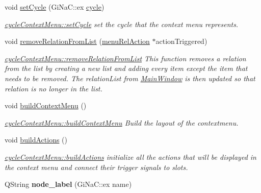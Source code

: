 \begin{DoxyCompactItemize}
void \mbox{\hyperlink{classcycle_context_menu_adf29caf51604118b6ced6a02c5172252}{set\+Cycle}} (Gi\+Na\+C\+::ex \mbox{\hyperlink{class_moeb_inv_1_1cycle}{cycle}})
\begin{DoxyCompactList}\small\item\em \mbox{\hyperlink{classcycle_context_menu_adf29caf51604118b6ced6a02c5172252}{cycle\+Context\+Menu\+::set\+Cycle}} set the cycle that the context menu represents. \end{DoxyCompactList}\item 
void \mbox{\hyperlink{classcycle_context_menu_a83f3eb1ea5338154095a7bf1e2c77b01}{remove\+Relation\+From\+List}} (\mbox{\hyperlink{classmenu_rel_action}{menu\+Rel\+Action}} $\ast$action\+Triggered)
\begin{DoxyCompactList}\small\item\em \mbox{\hyperlink{classcycle_context_menu_a83f3eb1ea5338154095a7bf1e2c77b01}{cycle\+Context\+Menu\+::remove\+Relation\+From\+List}} This function removes a relation from the list by creating a new list and adding every item except the item that needs to be removed. The \textquotesingle{}relation\+List\textquotesingle{} from \mbox{\hyperlink{class_main_window}{Main\+Window}} is then updated so that \textquotesingle{}relation\textquotesingle{} is no longer in the list. \end{DoxyCompactList}\item 
void \mbox{\hyperlink{classcycle_context_menu_a155448ae220555423d26b055f50b6e49}{build\+Context\+Menu}} ()
\begin{DoxyCompactList}\small\item\em \mbox{\hyperlink{classcycle_context_menu_a155448ae220555423d26b055f50b6e49}{cycle\+Context\+Menu\+::build\+Context\+Menu}} Build the layout of the contextmenu. \end{DoxyCompactList}\item 
\mbox{\label{classcycle_context_menu_a2ada1b40956db90398503d184afdd5ee}} 
void \mbox{\hyperlink{classcycle_context_menu_a2ada1b40956db90398503d184afdd5ee}{build\+Actions}} ()
\begin{DoxyCompactList}\small\item\em \mbox{\hyperlink{classcycle_context_menu_a2ada1b40956db90398503d184afdd5ee}{cycle\+Context\+Menu\+::build\+Actions}} initialize all the actions that will be displayed in the context menu and connect their trigger signals to slots. \end{DoxyCompactList}\item 
\mbox{\label{classcycle_context_menu_a17d519c784fac28e39da31478b810ae9}} 
Q\+String {\bfseries node\+\_\+label} (Gi\+Na\+C\+::ex name)
\end{DoxyCompactItemize}
